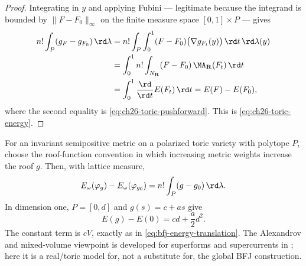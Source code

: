\begin{proof}
Integrating in \(y\) and applying Fubini --- legitimate because the
integrand is bounded by \(\lVert F-F_0\rVert_\infty\) on the finite measure
space \([0,1]\times P\) --- gives
\[
\begin{split}
 n!\int_P(g_F-g_{F_0})\,\rd\lambda
 &=n!\int_P\int_0^1(F-F_0)
     \bigl(\nabla g_{F_t}(y)\bigr)\,\rd t\,\rd\lambda(y)\\
 &=\int_0^1n!\int_{N_{\mathbf R}}(F-F_0)\,
     \MA_{\mathbf R}(F_t)\,\rd t\\
 &=\int_0^1\frac{\rd}{\rd t}E(F_t)\,\rd t
  =E(F)-E(F_0),
\end{split}
\]
where the second equality is \eqref{eq:ch26-toric-pushforward}.  This is
\eqref{eq:ch26-toric-energy}.
\end{proof}

\begin{example}
For an invariant semipositive metric on a polarized toric variety with
polytope \(P\), choose the roof-function convention in which increasing
metric weights increase the roof \(g\). Then, with lattice measure,
\[
              E_\omega(\varphi_g)-E_\omega(\varphi_{g_0})
              =n!\int_P(g-g_0)\,\rd \lambda.
\]
In dimension one, \(P=[0,d]\) and \(g(s)=c+as\) give
\[
              E(g)-E(0)=cd+\frac a2d^2.
\]
The constant term is \(cV\), exactly as in
\eqref{eq:bfj-energy-translation}. The Alexandrov and mixed-volume viewpoint is
developed for superforms and supercurrents in \cite{Ber26Convex}; here it is
a real/toric model for, not a substitute for, the global BFJ construction.
\end{example}

